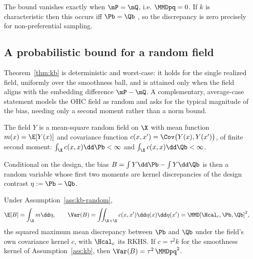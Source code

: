 \begin{remark}
\label{rem:kb-zero}
The bound vanishes exactly when $\mP=\mQ$, i.e. $\MMDpq=0$. If $k$ is
characteristic then this occurs iff $\Pb=\Qb$
\citep{sriperumbudur2010}, so the discrepancy is zero precisely for
non-preferential sampling.
\end{remark}

\subsection{A probabilistic bound for a random field}
\label{sec:kb-random}

Theorem~\ref{thm:kb} is deterministic and worst-case: it holds for the single
realized field, uniformly over the smoothness ball, and is attained only when the
field aligns with the embedding difference $\mP-\mQ$. A complementary, average-case
statement models the OHC field as random and asks for the typical magnitude of the
bias, needing only a second moment rather than a norm bound.

\begin{assumption}
\label{ass:kb-random}
The field $Y$ is a mean-square random field on $\X$ with mean function
$m(x)=\E[Y(x)]$ and covariance function $c(x,x')=\Cov\big(Y(x),Y(x')\big)$, of
finite second moment: $\int_\X c(x,x)\dd\Pb<\infty$ and $\int_\X c(x,x)\dd\Qb<\infty$.
\end{assumption}

Conditional on the design, the bias $B=\int Y\dd\Pb-\int Y\dd\Qb$ is then a random
variable whose first two moments are kernel discrepancies of the design contrast
$\eta:=\Pb-\Qb$.

\begin{proposition}
\label{prop:kb-moments}
Under Assumption~\ref{ass:kb-random},
\[
  \E[B]=\int_\X m\dd\eta,
  \qquad
  \Var(B)=\iint_{\X\times\X} c(x,x')\dd\eta(x)\dd\eta(x')
         =\MMD[\Hcal_c,\Pb,\Qb]^2 ,
\]
the squared maximum mean discrepancy between $\Pb$ and $\Qb$ under the field's own
covariance kernel $c$, with $\Hcal_c$ its RKHS. If $c=\tau^2 k$ for the smoothness
kernel of Assumption~\ref{ass:kb}, then $\Var(B)=\tau^2\,\MMDpq^2$.
\end{proposition}

